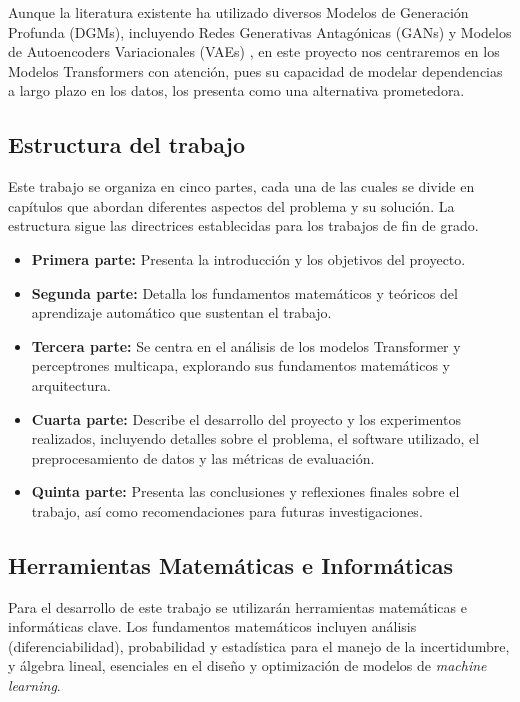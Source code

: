 Aunque la literatura existente ha utilizado diversos Modelos de Generación Profunda (DGMs), 
incluyendo Redes Generativas Antagónicas (GANs) y Modelos de Autoencoders
Variacionales (VAEs) \cite{de_deep_2022}, en este proyecto nos centraremos en los Modelos
Transformers con atención, pues su capacidad de modelar dependencias a largo
plazo en los datos, los presenta como una alternativa prometedora.

\subsection{Estructura del trabajo}

Este trabajo se organiza en cinco partes, cada una de las cuales se divide en
capítulos que abordan diferentes aspectos del problema y su solución. La
estructura sigue las directrices establecidas para los trabajos de fin de grado.

\begin{itemize}
    \item \textbf{Primera parte:} Presenta la introducción y los objetivos del
    proyecto. 
    \item \textbf{Segunda parte:} Detalla los fundamentos matemáticos
    y teóricos del aprendizaje automático que sustentan el trabajo.
    
    \item \textbf{Tercera parte:} Se centra en el análisis de los modelos
    Transformer y perceptrones multicapa, explorando sus fundamentos matemáticos y
    arquitectura.
    
    \item \textbf{Cuarta parte:} Describe el desarrollo del proyecto y los
    experimentos realizados, incluyendo detalles sobre el problema, el software
    utilizado, el preprocesamiento de datos y las métricas de evaluación.
    
    \item \textbf{Quinta parte:} Presenta las conclusiones y reflexiones finales
    sobre el trabajo, así como recomendaciones para futuras investigaciones.
    \end{itemize}

\subsection{Herramientas Matemáticas e Informáticas}

Para el desarrollo de este trabajo se utilizarán herramientas matemáticas e
informáticas clave. Los fundamentos matemáticos incluyen análisis
(diferenciabilidad), probabilidad y estadística para el manejo de la
incertidumbre, y álgebra lineal, esenciales en el diseño y
optimización de modelos de \textit{machine learning}. 

